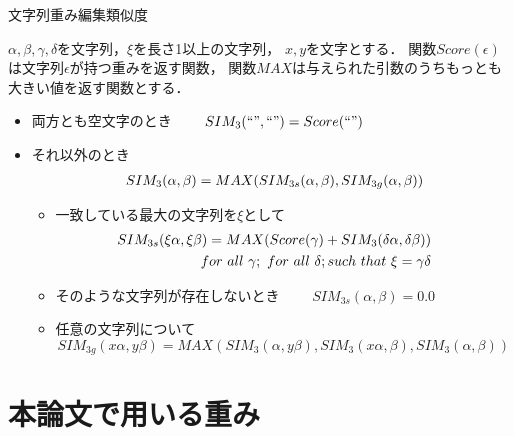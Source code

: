 \begin{df} 文字列重み編集類似度 \label{df:sim3}

$\alpha,\beta,\gamma,\delta$を文字列，$\xi$を長さ1以上の文字列，
$x,y$を文字とする．
関数$Score(\epsilon)$は文字列$\epsilon$が持つ重みを返す関数，
関数$MAX$は与えられた引数のうちもっとも大きい値を返す関数とする．
\begin{itemize}
\item 両方とも空文字のとき~~~~
$ SIM_3(``",``")=Score(``") $
\item それ以外のとき
\begin{eqnarray*}
&&\hspace*{-2mm}	SIM_3(\alpha,\beta)= 
		MAX(SIM_{3s}(\alpha,\beta),SIM_{3g}(\alpha,\beta))	
\end{eqnarray*}
\begin{itemize}
\item 一致している最大の文字列を$\xi$として
\begin{eqnarray*}
&&\hspace*{-8mm}	SIM_{3s}(\xi\alpha,\xi\beta)=
	MAX(Score(\gamma)+SIM_3(\delta\alpha,\delta\beta))\\
&&\hspace*{-6mm}	for~all~\gamma;~for~all~\delta; such~that~\xi=\gamma\delta
\end{eqnarray*}
\item そのような文字列が存在しないとき~~~~
$ SIM_{3s}(\alpha,\beta)=0.0 $
\item 任意の文字列について
\[ SIM_{3g}(x\alpha,y\beta)=
MAX(SIM_3(\alpha,y\beta),
SIM_3(x\alpha,\beta),
SIM_3(\alpha,\beta)) \]
\end{itemize}
\end{itemize}
\end{df}

\section{本論文で用いる重み}


